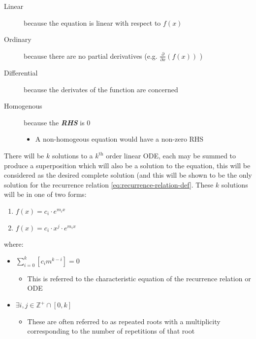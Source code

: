 \documentclass[a4paper,11pt,twoside]{article}
\begin{document}
\begin{description}
\item[{Linear}] because the equation is linear with respect to \(f(x)\)
\item[{Ordinary}] because there are no partial derivatives (e.g. \(\frac{\partial }{\partial x}{\left({ f{\left({ x }\right)} }\right)}\)  )
\item[{Differential}] because the derivates of the function are concerned
\item[{Homogenous}] because the \textbf{\emph{RHS}} is 0
\begin{itemize}
\item A non-homogeous equation would have a non-zero RHS
\end{itemize}
\end{description}

There will be \(k\) solutions to a \(k^{\mathrm{th}}\) order linear ODE, each may be summed to produce a superposition which will also be a solution to the equation, \cite[Ch. 4]{zillDifferentialEquations2009a}  this will be considered as the desired complete solution (and this will be shown to be the only solution for the recurrence relation \eqref{eq:recurrence-relation-def}. These \(k\) solutions will be in one of two forms:

\begin{enumerate}
\item \(f(x)=c_{i} \cdot e^{m_{i}x}\)
\item \(f(x)=c_{i} \cdot x^{j}\cdot e^{m_{i}x}\)
\end{enumerate}

where:

\begin{itemize}
\item \(\sum^{k}_{i=0}\left[  c_{i}m^{k-i} \right] = 0\)
\begin{itemize}
\item This is referred to the characteristic equation of the recurrence relation or ODE \cite{levinSolvingRecurrenceRelations2018}
\end{itemize}
\item \(\exists i,j \in \mathbb{Z}^{+} \cap \left[0,k\right]\)
\begin{itemize}
\item These are often referred to as repeated roots \cite{levinSolvingRecurrenceRelations2018,zillMatrixExponential2009} with a multiplicity corresponding to the number of repetitions of that root \cite[]{nicodemiIntroductionAbstractAlgebra2007}
\end{itemize}
\end{itemize}
\end{document}
